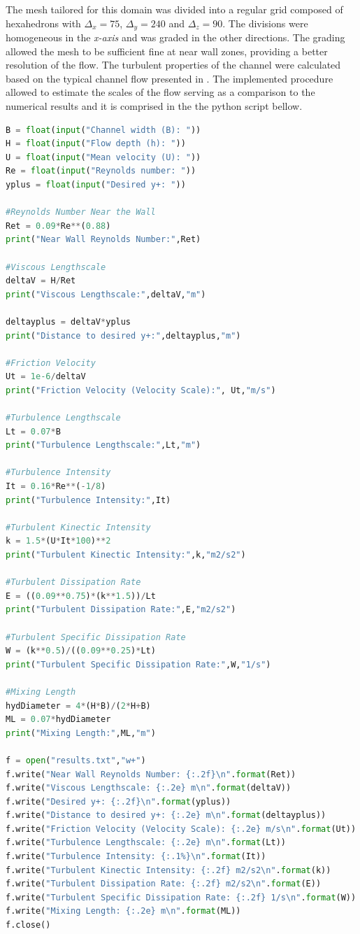 \begin{refsection}
The mesh tailored for this domain was divided into a regular grid composed of hexahedrons with $\Delta_x =75$, $\Delta_y = 240$ and $\Delta_z = 90$. The divisions were homogeneous in the \textit{x-axis} and was graded in the other directions. The grading allowed the mesh to be sufficient fine at near wall zones, providing a better resolution of the flow. The turbulent properties of the channel were calculated based on the typical channel flow presented in \textcite{Pope2000}. The implemented procedure allowed to estimate the scales of the flow serving as a comparison to the numerical results and it is comprised in the the python script bellow.

\begin{lstlisting}[language=python]
B = float(input("Channel width (B): "))
H = float(input("Flow depth (h): "))
U = float(input("Mean velocity (U): "))
Re = float(input("Reynolds number: "))
yplus = float(input("Desired y+: "))

#Reynolds Number Near the Wall
Ret = 0.09*Re**(0.88)
print("Near Wall Reynolds Number:",Ret)

#Viscous Lengthscale
deltaV = H/Ret
print("Viscous Lengthscale:",deltaV,"m")

deltayplus = deltaV*yplus
print("Distance to desired y+:",deltayplus,"m")

#Friction Velocity
Ut = 1e-6/deltaV
print("Friction Velocity (Velocity Scale):", Ut,"m/s")

#Turbulence Lengthscale
Lt = 0.07*B
print("Turbulence Lengthscale:",Lt,"m")

#Turbulence Intensity
It = 0.16*Re**(-1/8)
print("Turbulence Intensity:",It)

#Turbulent Kinectic Intensity
k = 1.5*(U*It*100)**2
print("Turbulent Kinectic Intensity:",k,"m2/s2")

#Turbulent Dissipation Rate
E = ((0.09**0.75)*(k**1.5))/Lt
print("Turbulent Dissipation Rate:",E,"m2/s2")

#Turbulent Specific Dissipation Rate
W = (k**0.5)/((0.09**0.25)*Lt)
print("Turbulent Specific Dissipation Rate:",W,"1/s")

#Mixing Length
hydDiameter = 4*(H*B)/(2*H+B)
ML = 0.07*hydDiameter
print("Mixing Length:",ML,"m")

f = open("results.txt","w+")
f.write("Near Wall Reynolds Number: {:.2f}\n".format(Ret))
f.write("Viscous Lengthscale: {:.2e} m\n".format(deltaV))
f.write("Desired y+: {:.2f}\n".format(yplus))
f.write("Distance to desired y+: {:.2e} m\n".format(deltayplus))
f.write("Friction Velocity (Velocity Scale): {:.2e} m/s\n".format(Ut))
f.write("Turbulence Lengthscale: {:.2e} m\n".format(Lt))
f.write("Turbulence Intensity: {:.1%}\n".format(It))
f.write("Turbulent Kinectic Intensity: {:.2f} m2/s2\n".format(k))
f.write("Turbulent Dissipation Rate: {:.2f} m2/s2\n".format(E))
f.write("Turbulent Specific Dissipation Rate: {:.2f} 1/s\n".format(W))
f.write("Mixing Length: {:.2e} m\n".format(ML))
f.close()
\end{lstlisting}


\end{refsection}
